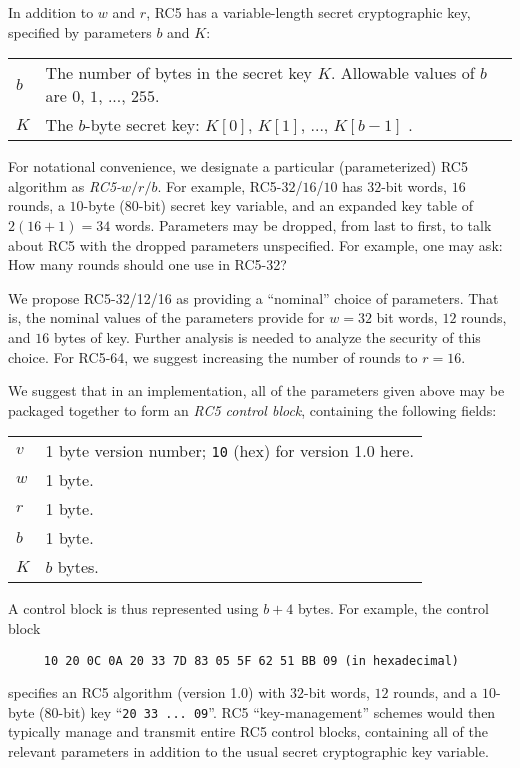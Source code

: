 In addition to $w$ and $r$, RC5 has a variable-length secret
cryptographic key, specified by parameters $b$ and $K$:

\begin{tabular}{ll}
    $b$ & \parbox[t]{4.43in}{The number of bytes in the secret key $K$.
                          Allowable values of  $b$  are  
                          $0$, $1$, ..., $255$.}\\
    $K$ & \parbox[t]{4.43in}{The  $b$-byte secret key: 
                          $K[0]$,  $K[1]$, ...,  $K[b-1]$ .}
\end{tabular}

For notational convenience, we designate
a particular (parameterized) RC5 algorithm as {\em
RC5-$w/r/b$}.  For example, 
RC5-$32$/$16$/$10$ has 
$32$-bit words,
$16$ rounds, 
a $10$-byte (80-bit) secret key variable,
and an expanded key table of $2(16+1)=34$ words.
Parameters may be dropped, from last to first, 
to talk about RC5 with the dropped parameters unspecified.  For example,
one may ask: How many rounds should one use in RC5-32?

We propose RC5-32/12/16 as providing a ``nominal'' choice of
parameters.  That is, the nominal values of the parameters provide
for $w=32$ bit words, $12$ rounds, and $16$ bytes of key.
Further analysis is needed to analyze the security of
this choice.  For RC5-64, we suggest increasing the number of
rounds to $r=16$.

We suggest that in an implementation, 
all of the parameters given above may be packaged together to
form an {\em RC5 control block},
containing the following fields:

\smallskip
\renewcommand{\arraystretch}{1.0}
\begin{tabular}{ll}
      $v$    & 1 byte version number; {\tt 10} (hex) for version 1.0 here.\\
      $w$    & 1 byte.\\
      $r$    & 1 byte.\\
      $b$    & 1 byte.\\
      $K$    & $b$ bytes.
\end{tabular}
\smallskip

A control block is thus represented using  $b + 4$  bytes.  
For example, the control block
\begin{verbatim}
     10 20 0C 0A 20 33 7D 83 05 5F 62 51 BB 09 (in hexadecimal)
\end{verbatim}
specifies an RC5 algorithm (version 1.0) with 
$32$-bit words, 
$12$ rounds, 
and a $10$-byte ($80$-bit) key  ``{\tt 20 33 ... 09}''.
RC5 ``key-management'' schemes would
then typically manage and transmit entire RC5 control
blocks, containing all of the relevant parameters in addition to
the usual secret cryptographic key variable.  

